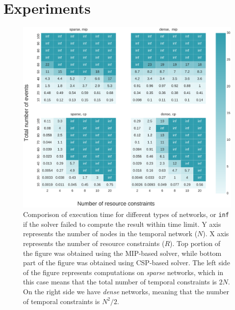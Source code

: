 \section{Experiments}

\begin{figure}
\begin{center}
\includegraphics[width=\textwidth]{execution_time}
\caption{Comporison of execution time for different types of networks, or \texttt{inf} if the solver failed to compute the result within time limit. Y axis represents the number of nodes in the temporal network ($N$). X axis represents the number of resource constraints ($R$). Top portion of the figure was obtained using the MIP-based solver, while bottom part of the figure was obtained using CSP-based solver. The left side of the figure represents computations on \textit{sparse} networks, which in this case means that the total number of temporal constraints is $2N$. On the right side we have \textit{dense} networks, meaning that the number of temporal constraints is $N^2/2$.}
\label{fig:execution_time}
\end{center}
\end{figure}

